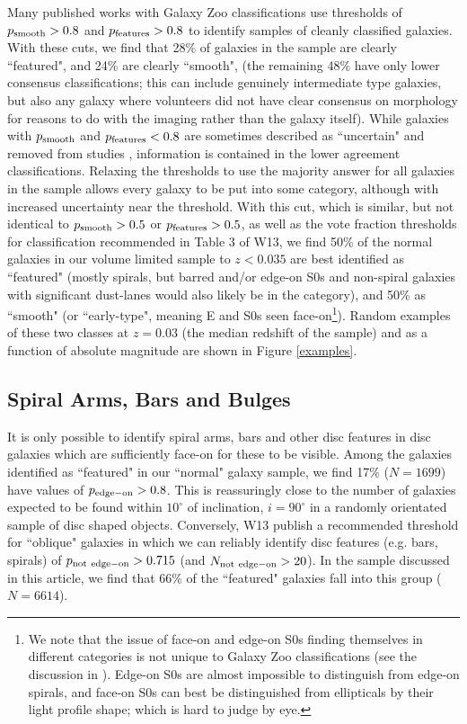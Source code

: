 \documentclass[usenatbib]{mn2e}
\begin{document}
 Many published works with Galaxy Zoo classifications use thresholds of $p_{\rm smooth}>0.8$ and $p_{\rm features}>0.8$ to identify samples of cleanly classified galaxies. With these cuts, we find that {28\%} of galaxies in the sample are clearly ``featured", and {24\%} are clearly ``smooth", (the remaining 48\% have only lower consensus classifications; this can include genuinely intermediate type galaxies, but also any galaxy where volunteers did not have clear consensus on morphology for reasons to do with the imaging rather than the galaxy itself). While galaxies with $p_{\rm smooth}$ and $p_{\rm features}<0.8$ are sometimes described as ``uncertain" and removed from studies \citep[e.g.][]{Schawinski2014}, information is contained in the lower agreement classifications. Relaxing the thresholds to use the majority answer for all galaxies in the sample allows every galaxy to be put into some category, although with increased uncertainty near the threshold. With this cut, which is similar, but not identical to  $p_{\rm smooth}>0.5$ or $p_{\rm features}>0.5$, as well as the vote fraction thresholds for classification recommended in Table 3 of W13, we find {50\%} of the normal galaxies in our volume limited sample to $z<0.035$ are best identified as ``featured" (mostly spirals, but barred and/or edge-on S0s and non-spiral galaxies with significant dust-lanes would also likely be in the category), and {50\%} as ``smooth" (or ``early-type", meaning E and S0s seen face-on\footnote{We note that the issue of face-on and edge-on S0s finding themselves in different categories is not unique to Galaxy Zoo classifications (see the discussion in \citealt{Bamford2009}). Edge-on S0s are almost impossible to distinguish from edge-on spirals, and face-on S0s can best be distinguished from ellipticals by their light profile shape; which is hard to judge by eye.}). Random examples of these two classes at $z=0.03$ (the median redshift of the sample) and as a function of absolute magnitude are shown in Figure \ref{examples}. 

\subsection{Spiral Arms, Bars and Bulges}
 
  It is only possible to identify spiral arms, bars and other disc features in disc galaxies which are sufficiently face-on for these to be visible.  Among the galaxies identified as ``featured" in our ``normal" galaxy sample, we find {17\% ($N=1 699$)} have values of $p_{\rm edge-on}>0.8$. This is reassuringly close to the number of galaxies expected to be found within $10^\circ$ of inclination, $i=90^\circ$ in a randomly orientated sample of disc shaped objects. 
Conversely, W13 publish a recommended threshold for ``oblique" galaxies in which we can reliably identify disc features (e.g. bars, spirals) of $p_{\rm not~edge-on}>0.715$ (and $N_{\rm not~edge-on}>20$). In the sample discussed in this article, we find that {66}\% of the ``featured" galaxies fall into this group {($N=6 614$)}. 
 
\end{document}
